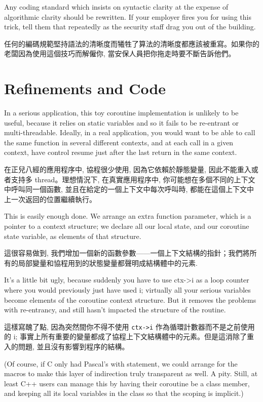 \documentclass[12pt]{article}
\begin{document}
\begin{CJK}{UTF8}{bsmi}
Any coding standard which insists on syntactic clarity at the expense of algorithmic clarity should be rewritten. If your employer fires you for using this trick, tell them that repeatedly as the security staff drag you out of the building.

 任何的編碼規範堅持語法的清晰度而犧牲了算法的清晰度都應該被重寫。如果你的老闆因為使用這個技巧而解僱你, 當安保人員把你拖走時要不斷告訴他們。 
\section{Refinements and Code}

In a serious application, this toy coroutine implementation is unlikely to be useful, because it relies on static variables and so it fails to be re-entrant or multi-threadable. Ideally, in a real application, you would want to be able to call the same function in several different contexts, and at each call in a given context, have control resume just after the last return in the same context.

 在正兒八經的應用程序中, 協程很少使用, 因為它依賴於靜態變量, 因此不能重入或者支持多 thread。理想情況下, 在真實應用程序中, 你可能想在多個不同的上下文中呼叫同一個函數, 並且在給定的一個上下文中每次呼叫時, 都能在這個上下文中上一次返回的位置繼續執行。 

This is easily enough done. We arrange an extra function parameter, which is a pointer to a context structure; we declare all our local state, and our coroutine state variable, as elements of that structure.

 這很容易做到, 我們增加一個新的函數參數——一個上下文結構的指針；我們將所有的局部變量和協程用到的狀態變量都聲明成結構體中的元素. 

It's a little bit ugly, because suddenly you have to use ctx->i as a loop counter where you would previously just have used i; virtually all your serious variables become elements of the coroutine context structure. But it removes the problems with re-entrancy, and still hasn't impacted the structure of the routine.

這樣寫醜了點, 因為突然間你不得不使用 \verb+ctx->i+ 作為循環計數器而不是之前使用的 i;
事實上所有重要的變量都成了協程上下文結構體中的元素。但是這消除了重入的問題, 並且沒有影響到程序的結構。 

(Of course, if C only had Pascal's with statement, we could arrange for the macros to make this layer of indirection truly transparent as well. A pity. Still, at least C++ users can manage this by having their coroutine be a class member, and keeping all its local variables in the class so that the scoping is implicit.)


\end{CJK}
\end{document}
